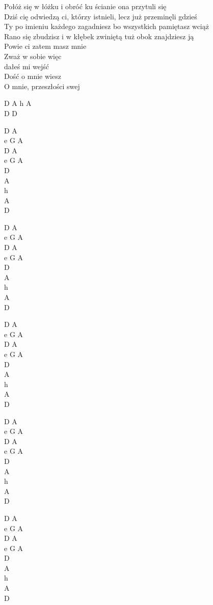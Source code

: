 \begin{text}
\begin{tinyTwo}
    Połóż się w łóżku i obróć ku ścianie ona przytuli się\\
    Dziś cię odwiedzą ci, którzy istnieli, lecz już przeminęli gdzieś\\
    Ty po imieniu każdego zagadniesz bo wszystkich pamiętasz wciąż\\
    Rano się zbudzisz i w kłębek zwiniętą tuż obok znajdziesz ją\\
    \vin Powie ci zatem masz mnie\\
    \vin Zważ w sobie więc\\
	\vin dałeś mi wejść\\
    \vin Dość o mnie wiesz\\
    \vin O mnie, przeszłości swej
    \end{tinyTwo}
\end{text}
\begin{chord}
    \begin{tinyTwo}
    D A h A\\
    D D

    D A\\
    e G A\\
    D A\\
    e G A\\
    D\\
    A\\
    h\\
    A\\
    D

    D A\\
    e G A\\
    D A\\
    e G A\\
    D\\
    A\\
    h\\
    A\\
    D

    D A\\
    e G A\\
    D A\\
    e G A\\
    D\\
    A\\
    h\\
    A\\
    D

    D A\\
    e G A\\
    D A\\
    e G A\\
    D\\
    A\\
    h\\
    A\\
    D

    D A\\
    e G A\\
    D A\\
    e G A\\
    D\\
    A\\
    h\\
    A\\
    D
    \end{tinyTwo}
\end{chord}